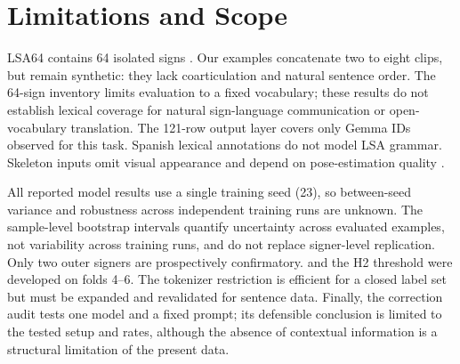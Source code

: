 \section{Limitations and Scope}

LSA64 contains 64 isolated signs \citep{ronchetti2016lsa64}.  Our examples
concatenate two to eight clips, but remain synthetic: they lack coarticulation
and natural sentence order.  The 64-sign inventory limits evaluation to a fixed
vocabulary; these results do not establish lexical coverage for natural
sign-language communication or open-vocabulary translation.  The 121-row output
layer covers only Gemma IDs observed for this task.  Spanish lexical annotations
do not model LSA grammar.  Skeleton inputs omit visual appearance and depend on
pose-estimation quality \citep{harrouch2026manual,nam2026liftsign}.

All reported model results use a single training seed (23), so between-seed
variance and robustness across independent training runs are unknown.  The
sample-level bootstrap intervals quantify uncertainty across evaluated examples,
not variability across training runs, and do not replace signer-level replication.
Only two outer signers are prospectively confirmatory.  \ImitatorEOne{} and the H2
threshold were developed on folds 4--6.
The tokenizer restriction is efficient for a closed label set but must be expanded
and revalidated for sentence data.  Finally, the correction audit tests one model
and a fixed prompt; its defensible conclusion is limited to the tested setup and
rates, although the absence of contextual information is a structural limitation
of the present data.
